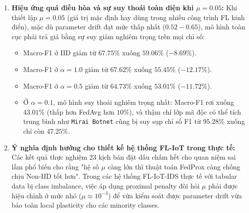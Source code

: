 \begin{enumerate}
    \item \textbf{Hiệu ứng quá điều hòa và sự suy thoái toàn diện khi $\mu = 0.05$:}
    Khi thiết lập $\mu = 0.05$ (giá trị mặc định hay dùng trong nhiều công trình FL kinh điển), mặc dù parameter drift đạt mức thấp nhất ($0.52 - 0.65$), mô hình toàn cục phải trả giá bằng sự suy giảm nghiêm trọng trên mọi chỉ số:
    \begin{itemize}
        \item Macro-F1 ở IID giảm từ $67.75\%$ xuống $59.06\%$ ($-8.69\%$).
        \item Macro-F1 ở $\alpha=1.0$ giảm từ $67.62\%$ xuống $55.45\%$ ($-12.17\%$).
        \item Macro-F1 ở $\alpha=0.5$ giảm từ $64.73\%$ xuống $53.01\%$ ($-11.72\%$).
        \item Ở $\alpha=0.1$, mô hình suy thoái nghiêm trọng nhất: Macro-F1 rơi xuống $43.01\%$ (thấp hơn FedAvg hơn $10\%$), và thậm chí lớp mã độc có thể tích trung bình như \texttt{Mirai Botnet} cũng bị suy sụp chỉ số F1 từ $95.28\%$ xuống chỉ còn $47.25\%$.
    \end{itemize}

    \item \textbf{Ý nghĩa định hướng cho thiết kế hệ thống FL-IoT trong thực tế:}
    Các kết quả thực nghiệm 23 kịch bản đặt dấu chấm hết cho quan niệm sai lầm phổ biến cho rằng "hệ số $\mu$ càng lớn thì thuật toán FedProx càng chống chịu Non-IID tốt hơn". Trong các hệ thống FL-IoT-IDS thực tế với tabular data bị class imbalance, việc áp dụng proximal penalty đòi hỏi $\mu$ phải được hiệu chỉnh ở mức nhỏ ($\mu \approx 10^{-3}$) để vừa kiểm soát được parameter drift vừa bảo toàn local plasticity cho các minority classes.
\end{enumerate}

